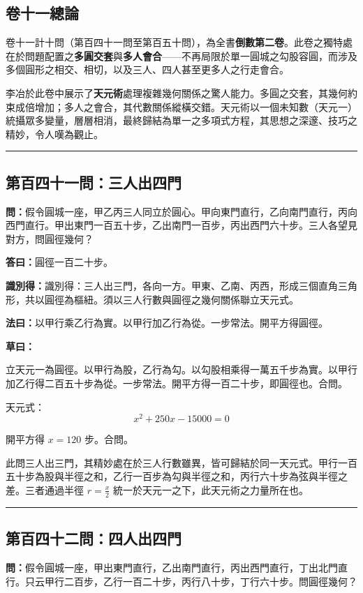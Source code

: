 \documentclass[11pt,a4paper]{article}
\newcommand{\longline}{\noindent\rule{\textwidth}{0.4pt}}
\newcommand{\wen}[1]{\par\noindent\textbf{\textcolor{probcolor}{問：}}{#1}\par}
\newcommand{\da}[1]{\par\noindent\textbf{\textcolor{anscolor}{答曰：}}{#1}\par}
\newcommand{\fayue}[1]{\par\noindent\textbf{\textcolor{methodcolor}{法曰：}}{#1}\par}
\newcommand{\caoyue}[1]{\par\noindent\textbf{草曰：}{#1}\par}
\newcommand{\zhi}[1]{\par\noindent\textbf{識別得：}{#1}\par}
\begin{document}
\subsection*{卷十一總論}

卷十一計十問（第百四十一問至第百五十問），為全書\textbf{倒數第二卷}。此卷之獨特處在於問題配置之\textbf{多圓交套}與\textbf{多人會合}——不再局限於單一圓城之勾股容圓，而涉及多個圓形之相交、相切，以及三人、四人甚至更多人之行走會合。

李冶於此卷中展示了\textbf{天元術}處理複雜幾何關係之驚人能力。多圓之交套，其幾何約束成倍增加；多人之會合，其代數關係縱橫交錯。天元術以一個未知數（天元一）統攝眾多變量，層層相消，最終歸結為單一之多項式方程，其思想之深邃、技巧之精妙，令人嘆為觀止。

\vspace{0.5cm}
\longline

\subsection*{第百四十一問：三人出四門}
\wen{假令圓城一座，甲乙丙三人同立於圓心。甲向東門直行，乙向南門直行，丙向西門直行。甲出東門一百五十步，乙出南門一百步，丙出西門六十步。三人各望見對方，問圓徑幾何？}

\da{圓徑一百二十步。}

\zhi{識別得：三人出三門，各向一方。甲東、乙南、丙西，形成三個直角三角形，共以圓徑為樞紐。須以三人行數與圓徑之幾何關係聯立天元式。}

\fayue{以甲行乘乙行為實。以甲行加乙行為從。一步常法。開平方得圓徑。}

\caoyue{
立天元一為圓徑。以甲行為股，乙行為勾。以勾股相乘得一萬五千步為實。以甲行加乙行得二百五十步為從。一步常法。開平方得一百二十步，即圓徑也。合問。

天元式：
$$x^2 + 250x - 15000 = 0$$

開平方得 $x = 120$ 步。合問。

此問三人出三門，其精妙處在於三人行數雖異，皆可歸結於同一天元式。甲行一百五十步為股與半徑之和，乙行一百步為勾與半徑之和，丙行六十步為弦與半徑之差。三者通過半徑 $r = \frac{x}{2}$ 統一於天元一之下，此天元術之力量所在也。
}

\vspace{0.5cm}
\longline

\subsection*{第百四十二問：四人出四門}
\wen{假令圓城一座，甲出東門直行，乙出南門直行，丙出西門直行，丁出北門直行。只云甲行二百步，乙行一百二十步，丙行八十步，丁行六十步。問圓徑幾何？}
\end{document}
